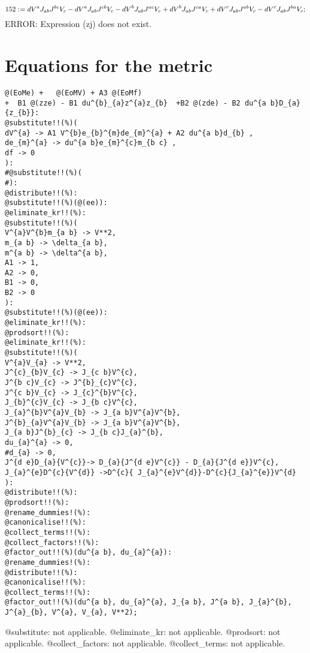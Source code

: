 \documentclass[11pt]{article}
\def\specialcolon{\mathrel{\mathop{:}}\hspace{-.5em}}
\begin{document}
\begin{dmath*}[compact, spread=2pt]
152\specialcolon{}= {dV}^{a} {J}_{a b} {J}^{b c} {V}_{c} - {dV}^{a} {J}_{a b} {J}^{c b} {V}_{c} - {dV}^{b} {J}_{a b} {J}^{a c} {V}_{c} + {dV}^{b} {J}_{a b} {J}^{c a} {V}_{c} + {dV}^{c} {J}_{a b} {J}^{a b} {V}_{c} - {dV}^{c} {J}_{a b} {J}^{b a} {V}_{c};
\end{dmath*}
{\color[named]{Red}%
ERROR: Expression (zj) does not exist.%
} %
\section*{Equations for the metric}
{\color[named]{Blue}\begin{verbatim}
@(EoMe) +   @(EoMV) + A3 @(EoMf) 
+  B1 @(zze) - B1 du^{b}_{a}z^{a}z_{b}  +B2 @(zde) - B2 du^{a b}D_{a}{z_{b}}:
@substitute!!(%)(
dV^{a} -> A1 V^{b}e_{b}^{m}de_{m}^{a} + A2 du^{a b}d_{b} ,
de_{m}^{a} -> du^{a b}e_{m}^{c}m_{b c} ,
df -> 0
):
#@substitute!!(%)(
#):
@distribute!!(%):
@substitute!!(%)(@(ee)):
@eliminate_kr!!(%):
@substitute!!(%)(
V^{a}V^{b}m_{a b} -> V**2,
m_{a b} -> \delta_{a b},
m^{a b} -> \delta^{a b},
A1 -> 1,
A2 -> 0,
B1 -> 0,
B2 -> 0
):
@substitute!!(%)(@(ee)):
@eliminate_kr!!(%):
@prodsort!!(%):
@eliminate_kr!!(%):
@substitute!!(%)(
V^{a}V_{a} -> V**2,
J^{c}_{b}V_{c} -> J_{c b}V^{c},
J^{b c}V_{c} -> J^{b}_{c}V^{c},
J^{c b}V_{c} -> J_{c}^{b}V^{c},
J_{b}^{c}V_{c} -> J_{b c}V^{c},
J_{a}^{b}V^{a}V_{b} -> J_{a b}V^{a}V^{b},
J^{b}_{a}V^{a}V_{b} -> J_{a b}V^{a}V^{b},
J_{a b}J^{b}_{c} -> J_{b c}J_{a}^{b},
du_{a}^{a} -> 0,
#d_{a} -> 0,
J^{d e}D_{a}{V^{c}}-> D_{a}{J^{d e}V^{c}} - D_{a}{J^{d e}}V^{c},
J_{a}^{e}D^{c}{V^{d}} ->D^{c}{ J_{a}^{e}V^{d}}-D^{c}{J_{a}^{e}}V^{d}
):
@distribute!!(%):
@prodsort!!(%):
@rename_dummies!(%):
@canonicalise!!(%):
@collect_terms!!(%):
@collect_factors!!(%):
@factor_out!!(%)(du^{a b}, du_{a}^{a}):
@rename_dummies!(%):
@distribute!!(%):
@canonicalise!!(%):
@collect_terms!!(%):
@factor_out!!(%)(du^{a b}, du_{a}^{a}, J_{a b}, J^{a b}, J_{a}^{b}, J^{a}_{b}, V^{a}, V_{a}, V**2);
\end{verbatim}}
@substitute: not applicable.
@eliminate\_kr: not applicable.
@prodsort: not applicable.
@collect\_factors: not applicable.
@collect\_terms: not applicable.
\end{document}
